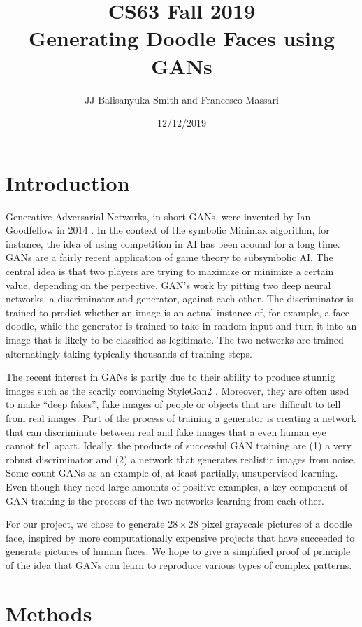 \documentclass[11pt]{article}
\title{CS63 Fall 2019\\Generating Doodle Faces using GANs }
\author{JJ Balisanyuka-Smith and Francesco Massari}
\date{12/12/2019}
\begin{document}
\maketitle

\section{Introduction}

Generative Adversarial Networks, in short GANs, were invented by Ian Goodfellow in
2014 \cite{goodfellow}. In the context of the symbolic Minimax algorithm, for instance, the idea of using competition in AI has been around for a long time.
GANs are a fairly recent application of game theory to subsymbolic AI.
The central idea is that two players are trying to maximize or minimize a certain value, depending on the perpective. GAN’s work by pitting two deep neural networks, a discriminator and generator, against each other. The discriminator is trained to predict whether an image is an actual instance of, for example, a face doodle, while the generator is trained to take in random input and turn it into an image that is likely to be classified as legitimate. The two networks are trained alternatingly taking typically thousands of training steps.

The recent interest in GANs is partly due to their ability to produce stunnig images such
as the scarily convincing StyleGan2 \cite{style}. Moreover, they are often used to make “deep fakes”,
fake images of people or objects that are difficult to tell from real images. Part of the process of training a generator is creating
a network that can discriminate between real and fake images that a even human eye cannot tell apart. Ideally, the products of successful GAN training are (1) a very robust discriminator and (2) a network that generates realistic images from noise. Some count GANs as an example of, at least partially, unsupervised learning. Even though they need large amounts of positive examples, a key component of GAN-training is the process of the two networks learning from each other.

For our project, we chose to generate $28 \times 28$ pixel grayscale pictures of a doodle face, inspired by more computationally expensive projects
that have succeeded to generate pictures of human faces. We hope to give a simplified proof of principle of the idea that GANs can learn to reproduce various types of complex patterns.

\section{Methods}
\end{document}

